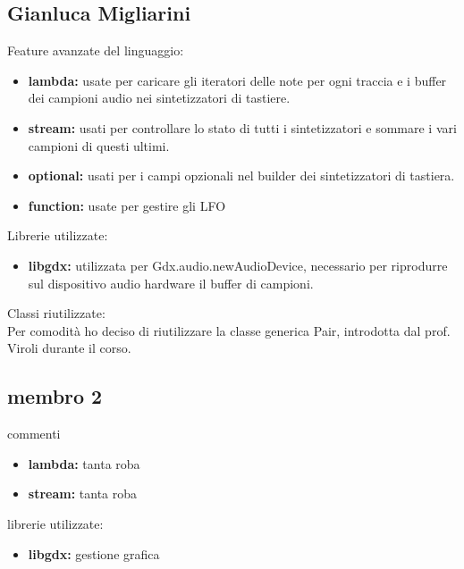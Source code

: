 \documentclass[a4paper,12pt]{report}
\begin{document}
\subsection{Gianluca Migliarini}
Feature avanzate del linguaggio:
\begin{itemize}
	\item \textbf{lambda:} usate per caricare gli iteratori delle note per ogni traccia e i buffer dei campioni audio nei sintetizzatori di tastiere.
	\item \textbf{stream:} usati per controllare lo stato di tutti i sintetizzatori e sommare i vari campioni di questi ultimi.
	\item \textbf{optional:} usati per i campi opzionali nel builder dei sintetizzatori di tastiera. 
	\item \textbf{function:} usate per gestire gli LFO
\end{itemize}
Librerie utilizzate:
\begin{itemize}
	\item \textbf{libgdx:} utilizzata per Gdx.audio.newAudioDevice, necessario per riprodurre sul dispositivo audio hardware il buffer di campioni.
\end{itemize}
Classi riutilizzate: \\
Per comodità ho deciso di riutilizzare la classe generica Pair, introdotta dal prof. Viroli durante il corso.
\newpage

\subsection{membro 2}
commenti
\begin{itemize}
	\item \textbf{lambda:} tanta roba
	\item \textbf{stream:} tanta roba
\end{itemize}
librerie utilizzate:
\begin{itemize}
	\item \textbf{libgdx:} gestione grafica
\end{itemize}
\newpage
\end{document}
